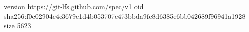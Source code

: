 version https://git-lfs.github.com/spec/v1
oid sha256:f0c02904e4c3679e1d4b053707e473bbda9fc8d6385e6bb042689f96941a1928
size 5623
